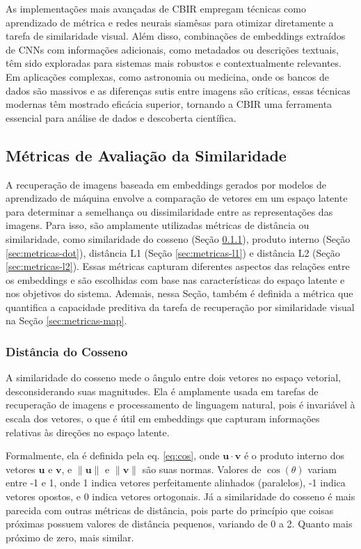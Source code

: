 As implementações mais avançadas de CBIR empregam técnicas como aprendizado de métrica e redes neurais siamêsas para otimizar diretamente a tarefa de similaridade visual. Além disso, combinações de embeddings extraídos de CNNs com informações adicionais, como metadados ou descrições textuais, têm sido exploradas para sistemas mais robustos e contextualmente relevantes. Em aplicações complexas, como astronomia ou medicina, onde os bancos de dados são massivos e as diferenças sutis entre imagens são críticas, essas técnicas modernas têm mostrado eficácia superior, tornando a CBIR uma ferramenta essencial para análise de dados e descoberta científica.






\subsection{Métricas de Avaliação da Similaridade}
\label{sec:metricas-sim}

A recuperação de imagens baseada em embeddings gerados por modelos de aprendizado de máquina envolve a comparação de vetores em um espaço latente para determinar a semelhança ou dissimilaridade entre as representações das imagens. Para isso, são amplamente utilizadas métricas de distância ou similaridade, como similaridade do cosseno (Seção \ref{sec:metricas-cos}), produto interno (Seção \ref{sec:metricas-dot}), distância L1 (Seção \ref{sec:metricas-l1}) e distância L2 (Seção \ref{sec:metricas-l2}). Essas métricas capturam diferentes aspectos das relações entre os embeddings e são escolhidas com base nas características do espaço latente e nos objetivos do sistema. Ademais, nessa Seção, também é definida a métrica que quantifica a capacidade preditiva da tarefa de recuperação por similaridade visual na Seção \ref{sec:metricas-map}.


\subsubsection{Distância do Cosseno}
\label{sec:metricas-cos}

A similaridade do cosseno mede o ângulo entre dois vetores no espaço vetorial, desconsiderando suas magnitudes. Ela é amplamente usada em tarefas de recuperação de imagens e processamento de linguagem natural, pois é invariável à escala dos vetores, o que é útil em embeddings que capturam informações relativas às direções no espaço latente.

Formalmente, ela é definida pela eq. \eqref{eq:cos}, onde \( \mathbf{u} \cdot \mathbf{v} \) é o produto interno dos vetores \( \mathbf{u} \) e \( \mathbf{v} \), e \( \|\mathbf{u}\| \) e \( \|\mathbf{v}\| \) são suas normas. Valores de $\cos(\theta)$ variam entre -1 e 1, onde 1 indica vetores perfeitamente alinhados (paralelos), -1 indica vetores opostos, e 0 indica vetores ortogonais. Já a similaridade do cosseno é mais parecida com outras métricas de distância, pois parte do princípio que coisas próximas possuem valores de distância pequenos, variando de 0 a 2. Quanto mais próximo de zero, mais similar.

